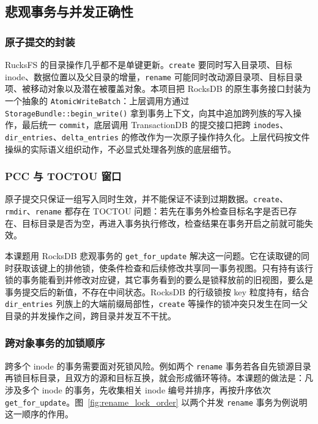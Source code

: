 \subsection{悲观事务与并发正确性}
\label{sec:txn_model}

\subsubsection{原子提交的封装}

RucksFS 的目录操作几乎都不是单键更新。\texttt{create} 要同时写入目录项、目标 inode、数据位置以及父目录的增量，\texttt{rename} 可能同时改动源目录项、目标目录项、被移动对象以及潜在被覆盖对象。本项目把 RocksDB 的原生事务接口封装为一个抽象的 \texttt{AtomicWriteBatch}：上层调用方通过 \texttt{StorageBundle::begin\_write()} 拿到事务上下文，向其中追加跨列族的写入操作，最后统一 \texttt{commit}，底层调用 TransactionDB 的提交接口把跨 \texttt{inodes}、\texttt{dir\_entries}、\texttt{delta\_entries} 的修改作为一次原子操作持久化。上层代码按文件操纵的实际语义组织动作，不必显式处理各列族的底层细节。

\subsubsection{PCC 与 TOCTOU 窗口}

原子提交只保证一组写入同时生效，并不能保证不读到过期数据。\texttt{create}、\texttt{rmdir}、\texttt{rename} 都存在 TOCTOU 问题：若先在事务外检查目标名字是否已存在、目标目录是否为空，再进入事务执行修改，检查结果在事务开启之前就可能失效。

本课题用 RocksDB 悲观事务的 \texttt{get\_for\_update} 解决这一问题。它在读取键的同时获取该键上的排他锁，使条件检查和后续修改共享同一事务视图。只有持有该行锁的事务能看到并修改对应键，其它事务看到的要么是锁释放前的旧视图，要么是事务提交后的新值，不存在中间状态。RocksDB 的行级锁按 key 粒度持有，结合 \texttt{dir\_entries} 列族上的大端前缀局部性，\texttt{create} 等操作的锁冲突只发生在同一父目录的并发操作之间，跨目录并发互不干扰。

\subsubsection{跨对象事务的加锁顺序}

跨多个 inode 的事务需要面对死锁风险。例如两个 \texttt{rename} 事务若各自先锁源目录再锁目标目录，且双方的源和目标互换，就会形成循环等待。本课题的做法是：凡涉及多个 inode 的事务，先收集相关 inode 编号并排序，再按升序依次 \texttt{get\_for\_update}。图~\ref{fig:rename_lock_order} 以两个并发 \texttt{rename} 事务为例说明这一顺序的作用。

